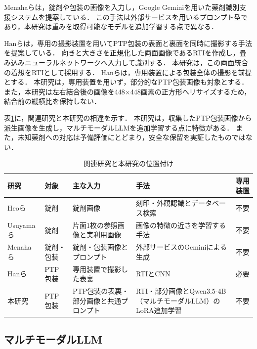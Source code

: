 \documentclass[uplatex,dvipdfmx]{jsarticle}
\begin{document}
Menahaらは，錠剤や包装の画像を入力し，Google Geminiを用いた薬剤識別支援システムを提案している\cite{menaha2024gemini}．
この手法は外部サービスを用いるプロンプト型であり，本研究は重みを取得可能なモデルを追加学習する点で異なる．

Hanらは，専用の撮影装置を用いてPTP包装の表面と裏面を同時に撮影する手法を提案している\cite{han2021blister}．
向きと大きさを正規化した両面画像であるRTIを作成し，畳み込みニューラルネットワークへ入力して識別する．
本研究は，この両面統合の着想をRTIとして採用する．
Hanらは，専用装置による包装全体の撮影を前提とする．
本研究は，専用装置を用いず，部分的なPTP包装画像も対象とする．
また，本研究は左右結合後の画像を448$\times$448画素の正方形へリサイズするため，結合前の縦横比を保持しない．

表\ref{tab:related_comparison}に，関連研究と本研究の相違を示す．
本研究は，収集したPTP包装画像から派生画像を生成し，マルチモーダルLLMを追加学習する点に特徴がある．
また，未知薬剤への対応は予備評価にとどまり，安全な保留を実証したものではない．

\begin{table}[htbp]
  \centering
  \caption{関連研究と本研究の位置付け}
  \label{tab:related_comparison}
  \small
  \renewcommand{\arraystretch}{1.25}
  \setlength{\tabcolsep}{3.5pt}
  \begin{tabularx}{\textwidth}{|>{\raggedright\arraybackslash}p{1.7cm}|>{\raggedright\arraybackslash}p{1.6cm}|>{\raggedright\arraybackslash}X|>{\raggedright\arraybackslash}X|>{\centering\arraybackslash}p{1.3cm}|}
    \hline
    研究 & 対象 & 主な入力 & 手法 & 専用装置 \\ \hline
    Heoら\cite{heo2023pill} & 錠剤 & 錠剤画像 & 刻印・外観認識とデータベース検索 & 不要 \\ \hline
    Usuyamaら\cite{usuyama2020epillid} & 錠剤 & 片面1枚の参照画像と実利用画像 & 画像の特徴の近さを学習する手法 & 不要 \\ \hline
    Menahaら\cite{menaha2024gemini} & 錠剤・包装 & 錠剤・包装画像とプロンプト & 外部サービスのGeminiによる生成 & 不要 \\ \hline
    Hanら\cite{han2021blister} & PTP包装 & 専用装置で撮影した表裏 & RTIとCNN & 必要 \\ \hline
    本研究 & PTP包装 & PTP包装の表裏・部分画像と共通プロンプト & RTI・部分画像とQwen3.5-4B（マルチモーダルLLM）のLoRA追加学習 & 不要 \\ \hline
  \end{tabularx}
\end{table}

\subsection{マルチモーダルLLM}\label{sec:vlm}
\end{document}
